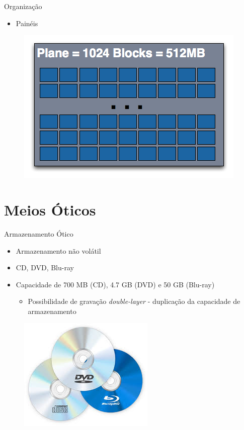 \documentclass[aspectratio=169,
				xcolor=table]{beamer}
\begin{document}
	\begin{frame}{Organização}
		\begin{itemize}
			\item Painéis
		\end{itemize}
		
		\begin{figure}[hbtp]
		\centering
		\includegraphics[height=0.75\textheight, keepaspectratio]{../figs/cap08/plane.png}
		\end{figure}		
	\end{frame}
	
	\section{Meios Óticos}
	\begin{frame}{Armazenamento Ótico}
		\begin{itemize}
			\item Armazenamento não volátil
			\vspace{1em}
			\item CD, DVD, Blu-ray
			\vspace{1em}
			\item Capacidade de 700 MB (CD), 4.7 GB (DVD) e 50 GB (Blu-ray)
			\begin{itemize}
				\item Possibilidade de gravação \textit{double-layer} - duplicação da capacidade de armazenamento
			\end{itemize}
		\end{itemize}
		\begin{figure}[hbtp]
		\centering
		\includegraphics[height=0.25\textheight, keepaspectratio]{../figs/cap08/otico}
		\end{figure}			
	\end{frame}
	
\end{document}
